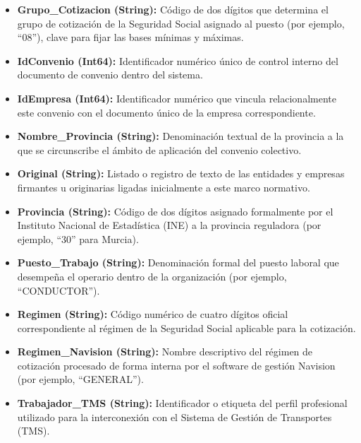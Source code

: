 \begin{itemize}
    \item \textbf{Grupo\_Cotizacion (String):} Código de dos dígitos que determina el grupo de cotización de la Seguridad Social asignado al puesto (por ejemplo, ``08''), clave para fijar las bases mínimas y máximas.
    \item \textbf{IdConvenio (Int64):} Identificador numérico único de control interno del documento de convenio dentro del sistema.
    \item \textbf{IdEmpresa (Int64):} Identificador numérico que vincula relacionalmente este convenio con el documento único de la empresa correspondiente.
    \item \textbf{Nombre\_Provincia (String):} Denominación textual de la provincia a la que se circunscribe el ámbito de aplicación del convenio colectivo.
    \item \textbf{Original (String):} Listado o registro de texto de las entidades y empresas firmantes u originarias ligadas inicialmente a este marco normativo.
    \item \textbf{Provincia (String):} Código de dos dígitos asignado formalmente por el Instituto Nacional de Estadística (INE) a la provincia reguladora (por ejemplo, ``30'' para Murcia).
    \item \textbf{Puesto\_Trabajo (String):} Denominación formal del puesto laboral que desempeña el operario dentro de la organización (por ejemplo, ``CONDUCTOR'').
    \item \textbf{Regimen (String):} Código numérico de cuatro dígitos oficial correspondiente al régimen de la Seguridad Social aplicable para la cotización.
    \item \textbf{Regimen\_Navision (String):} Nombre descriptivo del régimen de cotización procesado de forma interna por el software de gestión Navision (por ejemplo, ``GENERAL'').
    \item \textbf{Trabajador\_TMS (String):} Identificador o etiqueta del perfil profesional utilizado para la interconexión con el Sistema de Gestión de Transportes (TMS).
\end{itemize}


